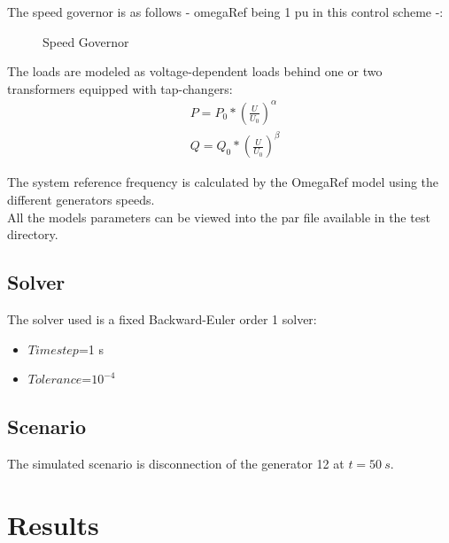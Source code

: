 \documentclass[a4paper, 12pt]{report}
\begin{document}
The speed governor is as follows - omegaRef being 1 pu in this control scheme -:
\begin{figure}[H]
\centering
{}
\caption{Speed Governor}
\end{figure}

The loads are modeled as voltage-dependent loads behind one or two transformers equipped with tap-changers:
\begin{equation*}
\begin{aligned}
& P = P_{0} * (\frac{U}{U_{0}})^\alpha \\
& Q = Q_{0} * (\frac{U}{U_{0}})^\beta
\end{aligned}
\label{Voltage-dependent load model}
\end{equation*}

The system reference frequency is calculated by the OmegaRef model using the different generators speeds.\\

All the models parameters can be viewed into the par file available in the test directory.

\subsection{Solver}
The solver used is a fixed Backward-Euler order 1 solver:
\begin{itemize}
\item $Time step$=1 s
\item $Tolerance$=$10^{-4}$
\end{itemize}

\subsection{Scenario}

The simulated scenario is disconnection of the generator 12 at $t = 50 \ s$.

\newpage
\section{Results}
\end{document}
